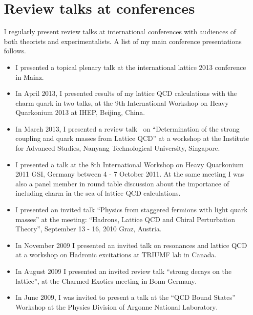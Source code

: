 \documentclass[12pt]{article}
\begin{document}


\section{Review talks at conferences}

I regularly present review talks at international
conferences with audiences of both theorists and experimentalists.
A list of my main conference presentations follows.

\begin{itemize}

\item I presented a topical plenary
      talk at the international lattice 2013 conference
      in Mainz.

\item In April 2013, I presented results of my lattice
      QCD calculations with the charm quark in two talks, at 
the 9th International Workshop on Heavy Quarkonium 2013 
at IHEP, Beijing, China.

\item In March 2013, I presented a 
review talk~\cite{McNeile:2013rga} on 
``Determination of the strong coupling and quark 
masses from Lattice QCD'' at a workshop
at the Institute for Advanced Studies, Nanyang Technological
University, Singapore.


\item I presented a talk at the 
8th International Workshop on Heavy Quarkonium 2011 
GSI, Germany between 4 - 7 October 2011. At the same meeting I
was also a panel member in round table discussion about the
importance of including charm in the sea of lattice QCD calculations.

\item I presented an invited talk 
   ``Physics from staggered fermions with light quark masses''
at the meeting:
``Hadrons, Lattice QCD and Chiral Perturbation Theory'',
September 13 - 16, 2010 Graz, Austria.

\item In November 2009 I presented an invited talk
      on resonances and lattice QCD at a
      workshop on Hadronic excitations at TRIUMF lab in Canada.

\item In August 2009 I presented an invited review talk
      ``strong decays on the lattice'',
       at the Charmed Exotics meeting in Bonn Germany.


\item In June 2009, I was invited to present a talk at 
      the ``QCD Bound States'' Workshop at
the Physics Division of Argonne National Laboratory.



\end{itemize}
\end{document}
